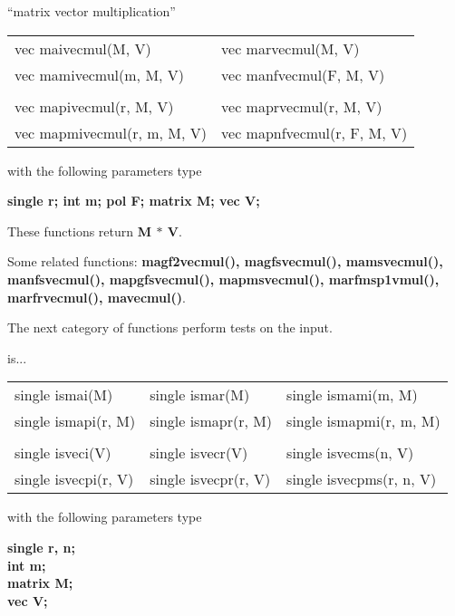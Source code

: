 \leer
\begin{center} ``matrix vector multiplication'' \end{center}
\begin{center}
{\bf
\begin{tabular}{ll}
vec maivecmul(M, V)   & vec marvecmul(M, V)   \\
vec mamivecmul(m, M, V) & vec manfvecmul(F, M, V) \\
&\\
vec mapivecmul(r, M, V)   & vec maprvecmul(r, M, V) \\
vec mapmivecmul(r, m, M, V) &  vec mapnfvecmul(r, F, M, V) \\
\end{tabular} }
\end{center}
\parbox[t]{2.5in}{with the following parameters type}
\parbox[t]{3.0in}{
\bf single r;\newline
    int m;\newline
    pol F;\newline
    matrix M;\newline
    vec V;}

These functions return {\bf M $*$ V}.

Some related functions:\hspace*{0.7em}
{\bf  magf2vecmul(), magfsvecmul(), mamsvecmul(), \\
manfsvecmul(), mapgfsvecmul(), mapmsvecmul(), marfmsp1vmul(), \\
marfrvecmul(), mavecmul()}.

\leer

\newpage

The next category of functions perform tests on the input.

\begin{center} is... \end{center}
\begin{center}
{\bf
\begin{tabular}{lll}
single ismai(M)  & single ismar(M)  & single ismami(m, M)\\
single ismapi(r, M) & single ismapr(r, M) & single ismapmi(r, m, M)\\
&&\\
single isveci(V)  & single isvecr(V)  & single isvecms(n, V)\\
single isvecpi(r, V) & single isvecpr(r, V) & single isvecpms(r, n, V)\\
\end{tabular} }
\end{center}
\parbox[t]{2.5in}{with the following parameters type}
\parbox[t]{3.0in}{\bf single r, n;\\
                      int m;\\
                      matrix M;\\
                      vec V;}

